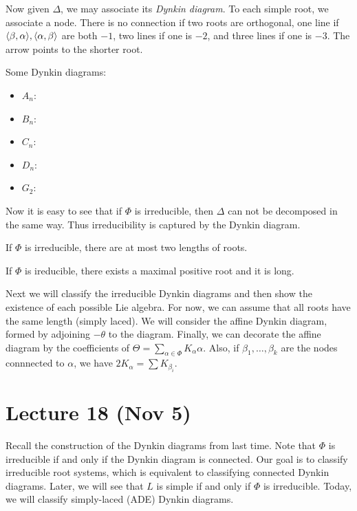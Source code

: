 \documentclass[twoside, 10pt]{article}
\begin{document}
    Now given $\Delta$, we may associate its \textit{Dynkin diagram}. To each simple root, we associate a node. There is no connection if two roots are orthogonal, one line if $\langle\beta,\alpha\rangle, \langle\alpha,\beta\rangle$ are both $-1$, two lines if one is $-2$, and three lines if one is $-3$. The arrow points to the shorter root.

    \begin{exm}
        Some Dynkin diagrams:
        \begin{itemize}
            \item $A_n$: 
            \item $B_n$: 
            \item $C_n$: 
            \item $D_n$: 
            \item $G_2$: 
        \end{itemize}
    \end{exm}

    Now it is easy to see that if $\Phi$ is irreducible, then $\Delta$ can not be decomposed in the same way. Thus irreducibility is captured by the Dynkin diagram.

    \begin{prop}
        If $\Phi$ is irreducible, there are at most two lengths of roots.
    \end{prop}

    \begin{prop}
        If $\Phi$ is ireducible, there exists a maximal positive root and it is long.
    \end{prop}

    Next we will classify the irreducible Dynkin diagrams and then show the existence of each possible Lie algebra. For now, we can assume that all roots have the same length (simply laced). We will consider the affine Dynkin diagram, formed by adjoining $-\theta$ to the diagram. Finally, we can decorate the affine diagram by the coefficients of $\Theta = \sum_{\alpha \in \Phi} K_{\alpha} \alpha$. Also, if $\beta_1, \ldots, \beta_k$ are the nodes connnected to $\alpha$, we have $2K_{\alpha} = \sum K_{\beta_i}$.

    \section{Lecture 18 (Nov 5)}%
    \label{sec:lecture_18_nov_5_}
    
    Recall the construction of the Dynkin diagrams from last time. Note that $\Phi$ is irreducible if and only if the Dynkin diagram is connected. Our goal is to classify irreducible root systems, which is equivalent to classifying connected Dynkin diagrams. Later, we will see that $L$ is simple if and only if $\Phi$ is irreducible. Today, we will classify simply-laced (ADE) Dynkin diagrams.
\end{document}
